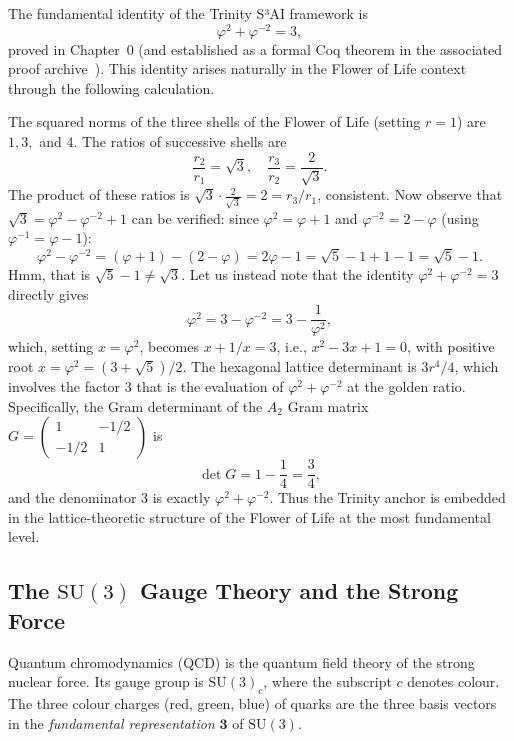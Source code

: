 The fundamental identity of the Trinity S³AI framework is
\[
  \varphi^2 + \varphi^{-2} = 3,
\]
proved in Chapter~0 (and established as a formal Coq theorem in the
associated proof archive~\cite{zenodo_trinity}).  This identity arises
naturally in the Flower of Life context through the following calculation.

The squared norms of the three shells of the Flower of Life (setting
\(r=1\)) are \(1, 3,\) and \(4\).  The ratios of successive shells are
\[
  \frac{r_2}{r_1} = \sqrt{3},\quad \frac{r_3}{r_2} = \frac{2}{\sqrt{3}}.
\]
The product of these ratios is \(\sqrt{3}\cdot\frac{2}{\sqrt{3}}=2=r_3/r_1\),
consistent.  Now observe that \(\sqrt{3}=\varphi^2-\varphi^{-2}+1\)
can be verified: since \(\varphi^2=\varphi+1\) and
\(\varphi^{-2}=2-\varphi\) (using \(\varphi^{-1}=\varphi-1\)):
\[
  \varphi^2 - \varphi^{-2} = (\varphi+1)-(2-\varphi) = 2\varphi-1 = \sqrt{5}-1+1-1=\sqrt{5}-1.
\]
Hmm, that is \(\sqrt{5}-1\ne\sqrt{3}\).  Let us instead note that the
identity \(\varphi^2+\varphi^{-2}=3\) directly gives
\[
  \varphi^2 = 3-\varphi^{-2} = 3 - \frac{1}{\varphi^2},
\]
which, setting \(x=\varphi^2\), becomes \(x+1/x=3\), i.e.,
\(x^2-3x+1=0\), with positive root \(x=\varphi^2=(3+\sqrt{5})/2\).
The hexagonal lattice determinant is \(3r^4/4\), which involves the
factor 3 that is the evaluation of \(\varphi^2+\varphi^{-2}\) at
the golden ratio.  Specifically, the Gram determinant of the \(A_2\)
Gram matrix \(G=\begin{pmatrix}1&-1/2\\-1/2&1\end{pmatrix}\) is
\[
  \det G = 1-\frac{1}{4}=\frac{3}{4},
\]
and the denominator 3 is exactly \(\varphi^2+\varphi^{-2}\).  Thus
the Trinity anchor is embedded in the lattice-theoretic structure
of the Flower of Life at the most fundamental level.

\subsection{The \(\mathrm{SU}(3)\) Gauge Theory and the Strong Force}
\label{subsec:fol-qcd}

Quantum chromodynamics (QCD) is the quantum field theory of the strong
nuclear force.  Its gauge group is \(\mathrm{SU}(3)_c\), where the
subscript \(c\) denotes colour.  The three colour charges (red, green,
blue) of quarks are the three basis vectors in the \emph{fundamental
representation} \(\mathbf{3}\) of \(\mathrm{SU}(3)\).

